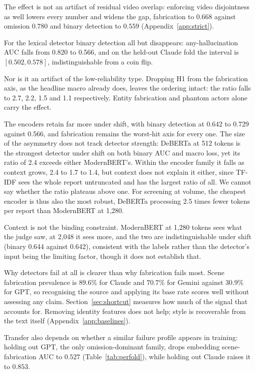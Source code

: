 \documentclass{article}
\begin{document}
The effect is not an artifact of residual video overlap: enforcing video
disjointness as well lowers every number and widens the gap, fabrication to
$0.668$ against omission $0.780$ and binary detection to $0.559$
(Appendix~\ref{app:strict}).

For the lexical detector binary detection all but disappears: any-hallucination
AUC falls from 0.820 to 0.566, and on the held-out Claude fold the interval is
$[0.502, 0.578]$, indistinguishable from a coin flip.

Nor is it an artifact of the low-reliability type. Dropping H1 from the
fabrication axis, as the headline macro already does, leaves the ordering
intact: the ratio falls to 2.7, 2.2, 1.5 and 1.1 respectively. Entity
fabrication and phantom actors alone carry the effect.

The encoders retain far more under shift, with binary detection at 0.642 to
0.729 against 0.566, and fabrication remains the worst-hit axis for every one.
The size of the asymmetry does not track detector strength: DeBERTa at 512
tokens is the strongest detector under shift on both binary AUC and macro loss,
yet its ratio of 2.4 exceeds either ModernBERT's. Within the encoder family it
falls as context grows, 2.4 to 1.7 to 1.4, but context does not explain it
either, since TF-IDF sees the whole report untruncated and has the largest
ratio of all. We cannot say whether the ratio plateaus above one. For screening at volume,
the cheapest encoder is thus also the most robust, DeBERTa processing 2.5 times
fewer tokens per report than ModernBERT at 1{,}280.

Context is not the binding constraint. ModernBERT at 1{,}280 tokens sees what
the judge saw, at 2{,}048 it sees more, and the two are indistinguishable under
shift (binary 0.644 against 0.642), consistent with the labels rather than the
detector's input being the limiting factor, though it does not establish that.

Why detectors fail at all is clearer than why fabrication fails most. Scene
fabrication prevalence is $89.6\%$ for Claude and $70.7\%$ for Gemini against
$30.9\%$ for GPT, so recognising the source and applying its base rate scores
well without assessing any claim. Section~\ref{sec:shortcut} measures how
much of the signal that accounts for. Removing
identity features does not help; style is recoverable from the text itself
(Appendix~\ref{app:baselines}).

Transfer also depends on whether a similar failure profile appears in training:
holding out GPT, the only omission-dominant family, drops embedding
scene-fabrication AUC to $0.527$ (Table~\ref{tab:perfold}), while holding out
Claude raises it to
$0.853$.
\end{document}
